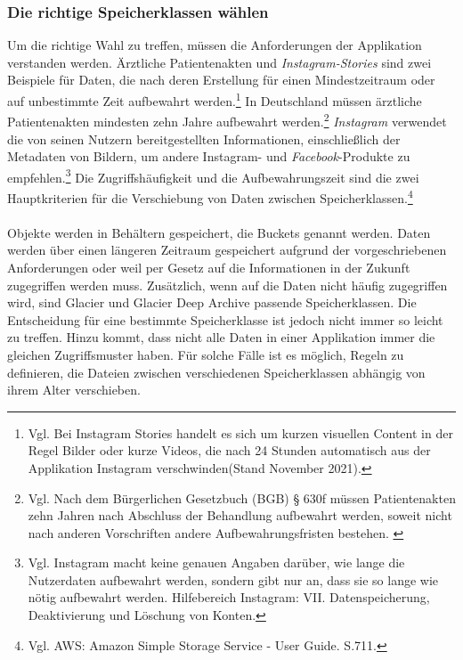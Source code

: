 \subsubsection{Die richtige Speicherklassen wählen}%
Um die richtige Wahl zu treffen, müssen die Anforderungen der Applikation verstanden werden. Ärztliche Patientenakten und \textit{Instagram-Stories} sind zwei Beispiele für Daten, die nach deren Erstellung für einen Mindestzeitraum oder auf unbestimmte Zeit aufbewahrt %
werden.\footnote{Vgl. Bei Instagram Stories handelt es sich um kurzen visuellen Content in der Regel Bilder oder kurze Videos, die nach 24 Stunden automatisch aus der Applikation Instagram verschwinden(Stand November 2021).\cite{IG2}} In Deutschland müssen ärztliche Patientenakten mindesten zehn Jahre aufbewahrt werden.\footnote{Vgl. Nach dem Bürgerlichen Gesetzbuch (BGB) § 630f müssen Patientenakten zehn Jahren nach Abschluss der Behandlung aufbewahrt werden, soweit nicht nach anderen Vorschriften andere Aufbewahrungsfristen bestehen. \cite{BGB}} \textit{Instagram} verwendet die von seinen Nutzern bereitgestellten Informationen, einschließlich der Metadaten von Bildern, um andere Instagram- und \textit{Facebook}-Produkte zu empfehlen.\footnote{Vgl. Instagram macht keine genauen Angaben darüber, wie lange die Nutzerdaten aufbewahrt werden, sondern gibt nur an, dass sie so lange wie nötig aufbewahrt werden. Hilfebereich Instagram: VII. Datenspeicherung, Deaktivierung und Löschung von Konten\cite{IG3}.}
Die Zugriffshäufigkeit und die Aufbewahrungszeit sind die zwei Hauptkriterien für die Verschiebung von Daten zwischen Speicherklassen.\footnote{Vgl. AWS: Amazon Simple Storage Service - User Guide. S.711.\cite{AMZ18}}
\\\\
Objekte werden in Behältern gespeichert, die Buckets genannt werden. Daten werden über einen längeren Zeitraum gespeichert aufgrund der vorgeschriebenen Anforderungen oder weil per Gesetz auf die Informationen in der Zukunft zugegriffen werden muss.
Zusätzlich, wenn auf die Daten nicht häufig zugegriffen wird, sind Glacier und Glacier Deep Archive passende Speicherklassen. Die Entscheidung für eine bestimmte Speicherklasse ist jedoch nicht immer so leicht zu treffen. %
Hinzu kommt, dass nicht alle Daten in einer Applikation immer die gleichen Zugriffsmuster haben. Für solche Fälle ist es möglich, Regeln zu definieren, die Dateien zwischen verschiedenen Speicherklassen abhängig von ihrem Alter verschieben.
\newpage

